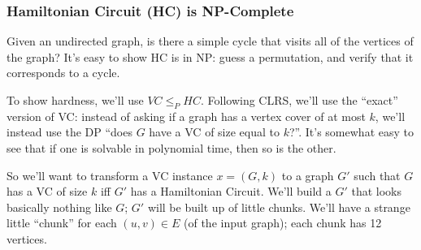 \documentclass{article}
\begin{document}
\subsubsection{Hamiltonian Circuit (HC) is NP-Complete}

Given an undirected graph, is there a simple cycle that visits all of the
vertices of the graph?
It's easy to show HC is in NP: guess a permutation, and verify that it 
corresponds to a cycle.

To show hardness, we'll use $VC \leq_P HC$. Following CLRS, we'll
use the ``exact'' version of VC: instead of asking if a graph has a vertex
cover of at most $k$, we'll instead use the DP ``does $G$ have a VC
of size equal to $k$?''. It's somewhat easy to see that if one is solvable
in polynomial time, then so is the other.

So we'll want to transform a VC instance $x = (G,k)$ to a graph $G'$
such that $G$ has a VC of size $k$ iff $G'$ has a Hamiltonian Circuit.
We'll build a $G'$ that looks basically nothing like $G$; $G'$ will be built
up of little chunks.
We'll have a strange little ``chunk'' for each $(u,v)\in E$ (of the
input graph); each chunk has 12 vertices.
\end{document}
